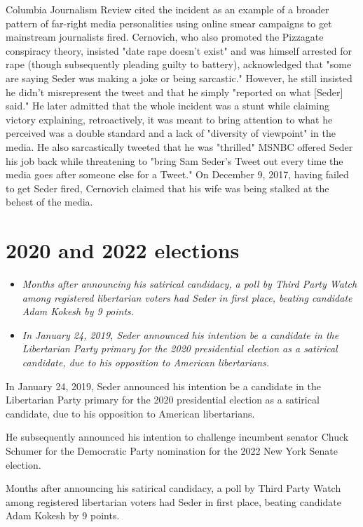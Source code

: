 Columbia Journalism Review cited the incident as an example of a broader
pattern of far-right media personalities using online smear campaigns to
get mainstream journalists fired. Cernovich, who also promoted the
Pizzagate conspiracy theory, insisted "date rape doesn't exist" and was
himself arrested for rape (though subsequently pleading guilty to
battery), acknowledged that "some are saying Seder was making a joke or
being sarcastic." However, he still insisted he didn't misrepresent the
tweet and that he simply "reported on what {[}Seder{]} said." He later
admitted that the whole incident was a stunt while claiming victory
explaining, retroactively, it was meant to bring attention to what he
perceived was a double standard and a lack of "diversity of viewpoint"
in the media. He also sarcastically tweeted that he was "thrilled" MSNBC
offered Seder his job back while threatening to "bring Sam Seder's Tweet
out every time the media goes after someone else for a Tweet." On
December 9, 2017, having failed to get Seder fired, Cernovich claimed
that his wife was being stalked at the behest of the media.

\section{2020 and 2022 elections}\label{and-2022-elections}

\begin{itemize}
\item
  \emph{Months after announcing his satirical candidacy, a poll by Third
  Party Watch among registered libertarian voters had Seder in first
  place, beating candidate Adam Kokesh by 9 points.}
\item
  \emph{In January 24, 2019, Seder announced his intention be a
  candidate in the Libertarian Party primary for the 2020 presidential
  election as a satirical candidate, due to his opposition to American
  libertarians.}
\end{itemize}

In January 24, 2019, Seder announced his intention be a candidate in the
Libertarian Party primary for the 2020 presidential election as a
satirical candidate, due to his opposition to American libertarians.

He subsequently announced his intention to challenge incumbent senator
Chuck Schumer for the Democratic Party nomination for the 2022 New York
Senate election.

Months after announcing his satirical candidacy, a poll by Third Party
Watch among registered libertarian voters had Seder in first place,
beating candidate Adam Kokesh by 9 points.

